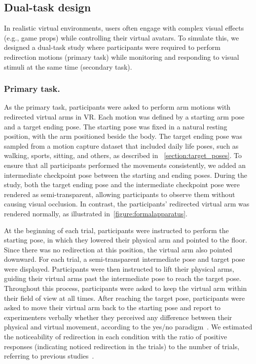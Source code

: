 \subsection{Dual-task design}

In realistic virtual environments, users often engage with complex visual effects (e.g., game props) while controlling their virtual avatars. 
To simulate this, we designed a dual-task study where participants were required to perform redirection motions (primary task) while monitoring and responding to visual stimuli at the same time (secondary task).

\subsubsection{Primary task.}
As the primary task, participants were asked to perform arm motions with redirected virtual arms in VR. 
Each motion was defined by a starting arm pose and a target ending pose. 
The starting pose was fixed in a natural resting position, with the arm positioned beside the body. 
The target ending pose was sampled from a motion capture dataset that included daily life poses, such as walking, sports, sitting, and others, as described in ~\autoref{section:target_poses}.
To ensure that all participants performed the movements consistently, we added an intermediate checkpoint pose between the starting and ending poses. 
During the study, both the target ending pose and the intermediate checkpoint pose were rendered as semi-transparent, allowing participants to observe them without causing visual occlusion. 
In contrast, the participants' redirected virtual arm was rendered normally, as illustrated in~\autoref{figure:formalapparatus}.


At the beginning of each trial, participants were instructed to perform the starting pose, in which they lowered their physical arm and pointed to the floor. 
Since there was no redirection at this position, the virtual arm also pointed downward. 
For each trial, a semi-transparent intermediate pose and target pose were displayed. 
Participants were then instructed to lift their physical arms, guiding their virtual arms past the intermediate pose to reach the target pose. 
Throughout this process, participants were asked to keep the virtual arm within their field of view at all times.
After reaching the target pose, participants were asked to move their virtual arm back to the starting pose and report to experimenters verbally whether they perceived any difference between their physical and virtual movement, according to the yes/no paradigm~\cite{leek2001adaptive}.
We estimated the noticeability of redirection in each condition with the ratio of positive responses (indicating noticed redirection in the trials) to the number of trials, referring to previous studies~\cite{li2022modeling}.

